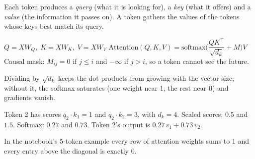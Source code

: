 \documentclass[11pt,a4paper]{article}
\begin{document}
\begin{bdef}[Attention]
Each token produces a \emph{query} (what it is looking for), a \emph{key} (what it offers) and a \emph{value} (the information it passes on). A token gathers the values of the tokens whose keys best match its query.
\end{bdef}
\begin{bmath}[Formula]
$Q=XW_Q,\;K=XW_K,\;V=XW_V$ \qquad $\mathrm{Attention}(Q,K,V)=\mathrm{softmax}\!\Big(\dfrac{QK^\top}{\sqrt{d_k}}+M\Big)V$\\[3pt]
Causal mask: $M_{ij}=0$ if $j\le i$ and $-\infty$ if $j>i$, so a token cannot see the future.
\end{bmath}
Dividing by $\sqrt{d_k}$ keeps the dot products from growing with the vector size; without it, the softmax saturates (one weight near 1, the rest near 0) and gradients vanish.
\begin{bex}
Token 2 has scores $q_2\cdot k_1=1$ and $q_2\cdot k_2=3$, with $d_k=4$. Scaled scores: $0.5$ and $1.5$. Softmax: $0.27$ and $0.73$. Token 2's output is $0.27\,v_1+0.73\,v_2$.
\end{bex}
\begin{bres}
In the notebook's 5-token example every row of attention weights sums to 1 and every entry above the diagonal is exactly 0.
\end{bres}
\end{document}

